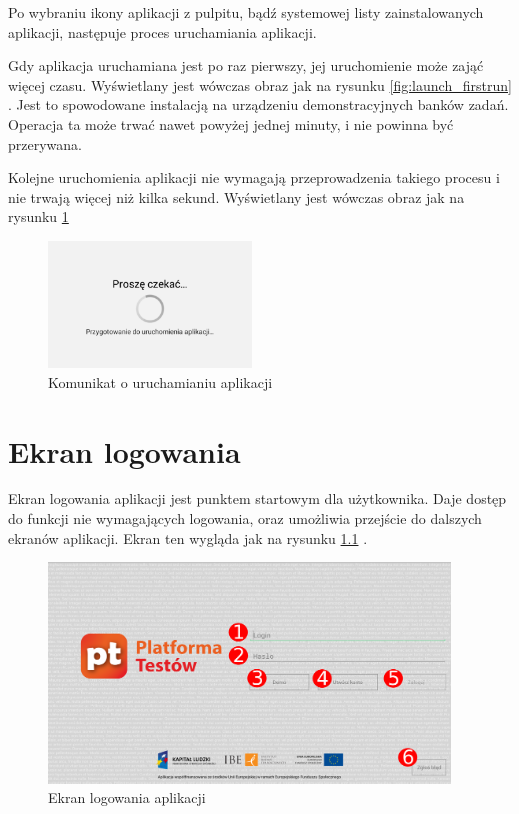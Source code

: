 \documentclass[a4paper,10pt,twosided]{book}
\newcommand{\refwithpage}[3]{
\ref{#1}\ifthenelse{\equal{\thepage}{\pageref{#1}}}{}{#2\pageref{#1}#3}%
}
\newcommand{\pref}[1]{\refwithpage{#1}{ (strona }{)}}
\begin{document}
Po wybraniu ikony aplikacji z pulpitu, bądź systemowej listy zainstalowanych aplikacji, następuje proces uruchamiania aplikacji.

Gdy aplikacja uruchamiana jest po raz pierwszy, jej uruchomienie może zająć więcej czasu. Wyświetlany jest wówczas obraz jak na rysunku \pref{fig:launch_firstrun}. Jest to spowodowane instalacją na urządzeniu demonstracyjnych banków zadań. Operacja ta może trwać nawet powyżej jednej minuty, i nie powinna być przerywana.

Kolejne uruchomienia aplikacji nie wymagają przeprowadzenia takiego procesu i nie trwają więcej niż kilka sekund. Wyświetlany jest wówczas obraz jak na rysunku \pref{fig:launch_normalrun}

\begin{figure}
\includegraphics[width=0.48\textwidth]{activity_launch-normal.png}
\caption{Komunikat o uruchamianiu aplikacji}
\label{fig:launch_normalrun}
\end{figure}


\chapter{Ekran logowania}
\label{chap:login}

Ekran logowania aplikacji jest punktem startowym dla użytkownika. Daje dostęp do funkcji nie wymagających logowania, oraz umożliwia przejście do dalszych ekranów aplikacji. Ekran ten wygląda jak na rysunku \pref{fig:login}.

\begin{figure}[h]
\vspace{-0.5em}
\includegraphics[width=0.95\textwidth]{activity_login.pdf}
\caption{Ekran logowania aplikacji}
\label{fig:login}
\end{figure}
\end{document}
